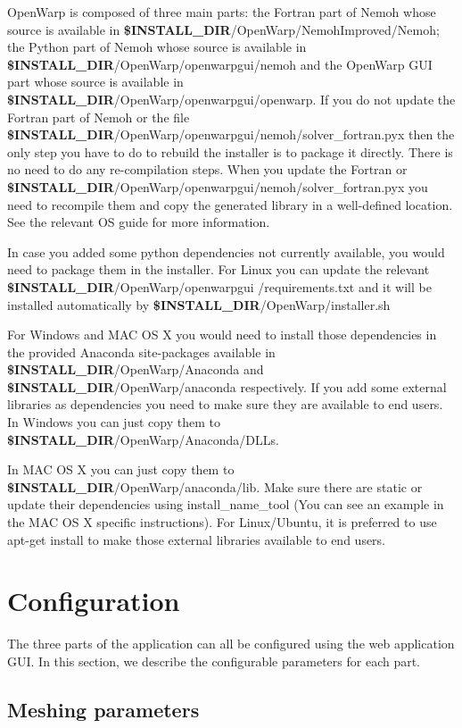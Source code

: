 \documentclass[12pt]{article}
\newcommand{\INSTALLDIR}{{\textbf{\$INSTALL{\_}DIR}}}
\begin{document}
OpenWarp is composed of three main parts: the Fortran part of Nemoh whose source is available in \INSTALLDIR/OpenWarp/NemohImproved/Nemoh; the Python part of Nemoh whose source is available in \INSTALLDIR/OpenWarp/openwarpgui/nemoh and the OpenWarp GUI part whose source is available in \INSTALLDIR/OpenWarp/openwarpgui/openwarp.
If you do not update the Fortran part of Nemoh or the file \INSTALLDIR/OpenWarp/openwarpgui/nemoh/solver_fortran.pyx then the only step you have to do to rebuild the installer is to package it directly. There is no need to do any re-compilation steps.
When you update the Fortran or \INSTALLDIR/OpenWarp/openwarpgui/nemoh/solver_fortran.pyx you need to recompile them and copy the generated library in a well-defined location. See the relevant OS guide for more information.


In case you added some python dependencies not currently available, you would need to package them in the installer. For Linux you can update the relevant \INSTALLDIR/OpenWarp/openwarpgui /requirements.txt and it will be installed automatically by \INSTALLDIR/OpenWarp/installer.sh

For Windows and MAC OS X you would need to install those dependencies in the provided Anaconda site-packages available in \INSTALLDIR/OpenWarp/Anaconda and \INSTALLDIR/OpenWarp/anaconda respectively.
If you add some external libraries as dependencies you need to make sure they are available to end users. In Windows you can just copy them to \INSTALLDIR/OpenWarp/Anaconda/DLLs.

In MAC OS X you can just copy them to \INSTALLDIR/OpenWarp/anaconda/lib. Make sure there are static or update their dependencies using install_name_tool (You can see an example in the MAC OS X specific instructions).
For Linux/Ubuntu, it is preferred to use apt-get install to make those external libraries available to end users.

\section{Configuration}
The three parts of the application can all be configured using the web application GUI. In this section, we describe the configurable parameters for each part.

\subsection{Meshing parameters}
\end{document}
